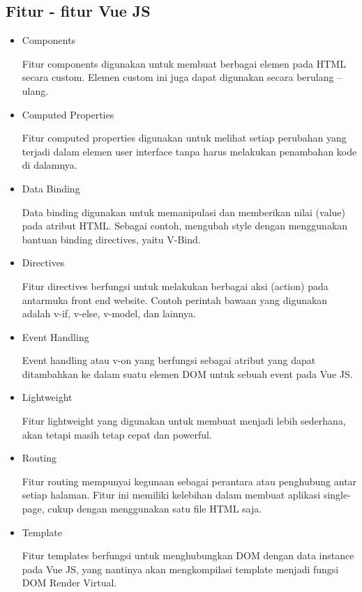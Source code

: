 \subsection{Fitur - fitur Vue JS}
\begin{itemize}
  \item Components
  
  Fitur components digunakan untuk membuat berbagai elemen pada HTML secara custom. Elemen custom ini juga dapat digunakan secara berulang – ulang.

  \item Computed Properties
  
  Fitur computed properties digunakan untuk melihat setiap perubahan yang terjadi dalam elemen user interface tanpa harus melakukan penambahan kode di dalamnya.

  \item Data Binding
  
  Data binding digunakan untuk memanipulasi dan memberikan nilai (value) pada atribut HTML. Sebagai contoh, mengubah style dengan menggunakan bantuan binding directives, yaitu V-Bind.

  \item Directives
  
  Fitur directives berfungsi untuk melakukan berbagai aksi (action) pada antarmuka front end website. Contoh perintah bawaan yang digunakan adalah v-if, v-else, v-model, dan lainnya.

  \item Event Handling
  
  Event handling atau v-on yang berfungsi sebagai atribut yang dapat ditambahkan ke dalam suatu elemen DOM untuk sebuah event pada Vue JS.

  \item Lightweight
  
  Fitur lightweight yang digunakan untuk membuat menjadi lebih sederhana, akan tetapi masih tetap cepat dan powerful.

  \item Routing
  
  Fitur routing mempunyai kegunaan sebagai perantara atau penghubung antar setiap halaman. Fitur ini memiliki kelebihan dalam membuat aplikasi single-page, cukup dengan menggunakan satu file HTML saja.

  \item Template
  
  Fitur templates berfungsi untuk menghubungkan DOM dengan data instance pada Vue JS, yang nantinya akan mengkompilasi template menjadi fungsi DOM Render Virtual.


\end{itemize}
